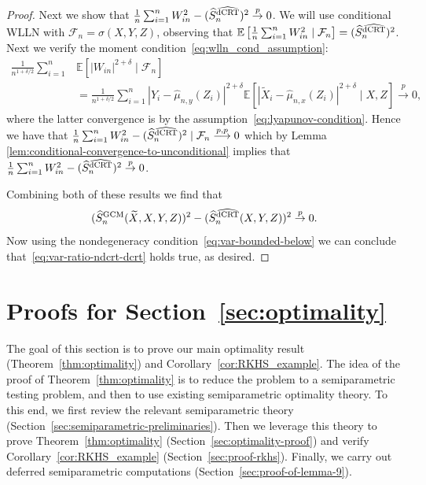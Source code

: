 \documentclass[aos]{imsart}
\theoremstyle{plain}
\theoremstyle{remark}
\newcommand{\E}{\mathbb E}								%
\newcommand{\convp}{\overset p \rightarrow}             %
\newcommand{\srx}{X}									%
\newcommand{\srz}{Z}									%
\newcommand{\srxk}{\widetilde X}						%
\newcommand{\sry}{Y}									%
\newcommand{\GCM}{\textnormal{GCM}}						%
\newcommand{\dCRThat}{\widehat{\textnormal{dCRT}}}		%
\newcommand{\convpp}{\overset {p,p} \longrightarrow}    %
\begin{document}
\begin{proof}
Next we show that $\frac{1}{n} \sum_{i=1}^n W^2_{in} - (\widehat S_{n}^{\dCRThat})^2 \convp 0$. We will use conditional WLLN with $\mathcal{F}_n = \sigma(\srx,\sry,\srz)$, observing that $\E\left[\frac{1}{n} \sum_{i=1}^n W^2_{in} \mid \mathcal{F}_n\right] = (\widehat S_{n}^{\dCRThat})^2 $. Next we verify the moment condition~\eqref{eq:wlln_cond_assumption}:
\begin{align}
	\frac{1}{n^{1+\delta/2}} \sum_{i = 1}^n &\E[|W_{in}|^{2+\delta} \mid \mathcal{F}_n] \\&= \frac{1}{n^{1+\delta/2}} \sum_{i=1}^n |\sry_i-\widehat\mu_{n,y}(\srz_i)|^{2+\delta}\E\left[|\srxk_i-\widehat\mu_{n,x}(\srz_i)|^{2+\delta}\mid \srx,\srz\right] \convp 0,
\end{align} 
where the latter convergence is by the assumption~\eqref{eq:lyapunov-condition}.
Hence we have that $\frac{1}{n} \sum_{i = 1}^n W^2_{in} - (\widehat S_{n}^{\dCRThat})^2  \mid \mathcal F_n \convpp 0$ which by Lemma \ref{lem:conditional-convergence-to-unconditional} implies that $\frac{1}{n} \sum_{i=1}^n W^2_{in} - (\widehat S_{n}^{\dCRThat})^2 \convp 0$.

Combining both of these results we find that 
\begin{equation*}
(\widehat S_{n}^{\GCM}(\srxk, \srx, \sry, \srz))^2 - (\widehat S_{n}^{\dCRThat}(\srx, \sry, \srz))^2 \convp 0. 
\end{equation*}
Now using the nondegeneracy condition~\eqref{eq:var-bounded-below} we can conclude that~\eqref{eq:var-ratio-ndcrt-dcrt} holds true, as desired.
\end{proof}

\section{Proofs for Section~\ref{sec:optimality}} \label{sec:optimality-proofs}

The goal of this section is to prove our main optimality result (Theorem~\ref{thm:optimality}) and Corollary~\ref{cor:RKHS_example}. The idea of the proof of Theorem~\ref{thm:optimality} is to reduce the problem to a semiparametric testing problem, and then to use existing semiparametric optimality theory. To this end, we first review the relevant semiparametric theory (Section~\ref{sec:semiparametric-preliminaries}). Then we leverage this theory to prove Theorem~\ref{thm:optimality} (Section~\ref{sec:optimality-proof}) and verify Corollary~\ref{cor:RKHS_example} (Section~\ref{sec:proof-rkhs}). Finally, we carry out deferred semiparametric computations (Section~\ref{sec:proof-of-lemma-9}).
\end{document}
